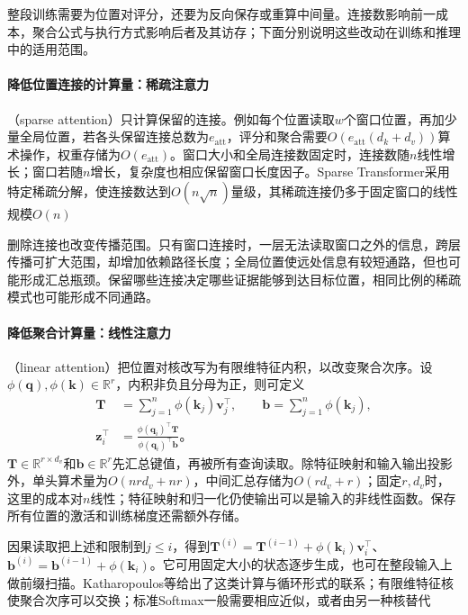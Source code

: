 整段训练需要为位置对评分，还要为反向保存或重算中间量。连接数影响前一成本，聚合公式与执行方式影响后者及其访存；下面分别说明这些改动在训练和推理中的适用范围。

\paragraph{降低位置连接的计算量：稀疏注意力}

（sparse attention）只计算保留的连接。例如每个位置读取$w$个窗口位置，再加少量全局位置，若各头保留连接总数为$e_{\mathrm{att}}$，评分和聚合需要$O(e_{\mathrm{att}}(d_k+d_v))$算术操作，权重存储为$O(e_{\mathrm{att}})$。窗口大小和全局连接数固定时，连接数随$n$线性增长；窗口若随$n$增长，复杂度也相应保留窗口长度因子。Sparse Transformer采用特定稀疏分解，使连接数达到$O(n\sqrt n)$量级，其稀疏连接仍多于固定窗口的线性规模$O(n)$

删除连接也改变传播范围。只有窗口连接时，一层无法读取窗口之外的信息，跨层传播可扩大范围，却增加依赖路径长度；全局位置使远处信息有较短通路，但也可能形成汇总瓶颈。保留哪些连接决定哪些证据能够到达目标位置，相同比例的稀疏模式也可能形成不同通路。

\paragraph{降低聚合计算量：线性注意力}

（linear attention）把位置对核改写为有限维特征内积，以改变聚合次序。设$\phi(\bm q),\phi(\bm k)\in\mathbb R^r$，内积非负且分母为正，则可定义
\begin{equation}
  \begin{aligned}
    \bm T&=\sum_{j=1}^n\phi(\bm k_j)\bm v_j^{\top},\qquad
    \bm b=\sum_{j=1}^n\phi(\bm k_j),\\
    \bm z_i^{\top}&=\frac{\phi(\bm q_i)^{\top}\bm T}
                           {\phi(\bm q_i)^{\top}\bm b}\text{。}
  \end{aligned}
  \label{eq:transformer-linear-attention}
\end{equation}
$\bm T\in\mathbb R^{r\times d_v}$和$\bm b\in\mathbb R^r$先汇总键值，再被所有查询读取。除特征映射和输入输出投影外，单头算术量为$O(nrd_v+nr)$，中间汇总存储为$O(rd_v+r)$；固定$r,d_v$时，这里的成本对$n$线性；特征映射和归一化仍使输出可以是输入的非线性函数。保存所有位置的激活和训练梯度还需额外存储。

因果读取把上述和限制到$j\leq i$，得到$\bm T^{(i)}=\bm T^{(i-1)}+\phi(\bm k_i)\bm v_i^{\top}$、$\bm b^{(i)}=\bm b^{(i-1)}+\phi(\bm k_i)$。它可用固定大小的状态逐步生成，也可在整段输入上做前缀扫描。Katharopoulos等给出了这类计算与循环形式的联系；有限维特征核使聚合次序可以交换；标准Softmax一般需要相应近似，或者由另一种核替代

